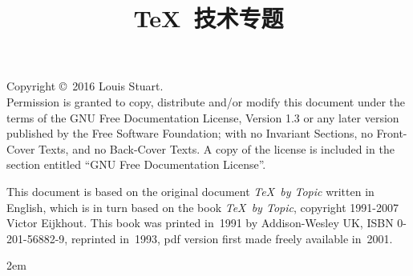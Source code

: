 \documentclass[twoside,letterpaper,mctitle,no-math]{rapport3}
\title{\TeX\ 技术专题}
\author{Victor Eijkhout 著 \\ 李延瑞 \quad 鲁尚文 \hskip 0.5em 译}
\date{}
\begin{document}
\maketitle

Copyright \copyright\ 2016 Louis Stuart.\\
Permission is granted to copy, distribute and/or modify this document
under the terms of the GNU Free Documentation License, Version 1.3
or any later version published by the Free Software Foundation;
with no Invariant Sections, no Front-Cover Texts, and no Back-Cover
Texts.  A copy of the license is included in the section entitled ``GNU
Free Documentation License''.
\par\medskip
This document is based on the original document {\itshape \TeX\ by Topic} written in English, 
which is in turn based on the book {\itshape \TeX\ by Topic},
copyright 1991-2007 Victor Eijkhout. This book was
printed in~1991 by Addison-Wesley UK, ISBN 0-201-56882-9, reprinted
in~1993, pdf version first made freely available in~2001.

\tableofcontents



\parindent2em\relax


\end{document}

